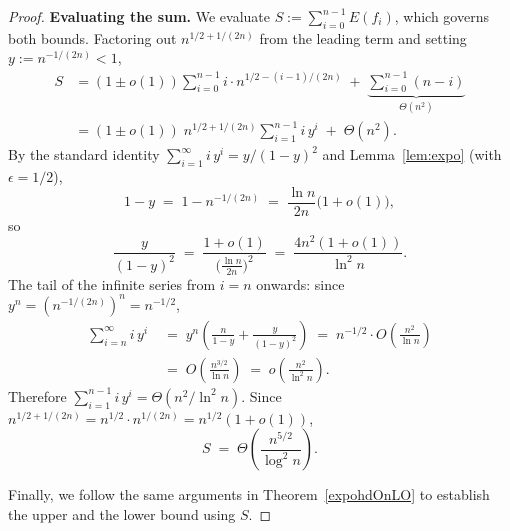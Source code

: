 \documentclass[lettersize,journal]{IEEEtran}
\begin{document}
\begin{proof}
\medskip
\noindent\textbf{Evaluating the sum.}
We evaluate $S := \sum_{i=0}^{n-1} E(f_i)$, which governs both bounds.
Factoring out $n^{1/2+1/(2n)}$ from the leading term and setting
$y:=n^{-1/(2n)}<1$,
\begin{align*}
S
&= (1\pm o(1))\sum_{i=0}^{n-1} i\cdot n^{1/2-(i-1)/(2n)}
   \;+\;\underbrace{\sum_{i=0}^{n-1}(n-i)}_{\Theta(n^2)} \\
&= (1\pm o(1))\;n^{1/2+1/(2n)}\sum_{i=1}^{n-1} i\,y^{i}
   \;+\;\Theta(n^2).
\end{align*}
By the standard identity $\sum_{i=1}^{\infty} i\,y^i = y/(1-y)^2$
and Lemma~\ref{lem:expo} (with $\epsilon=1/2$),
\[
1-y \;=\; 1 - n^{-1/(2n)}
    \;=\; \frac{\ln n}{2n}\bigl(1+o(1)\bigr),
\]
so
\[
\frac{y}{(1-y)^2}
\;=\; \frac{1+o(1)}{\bigl(\frac{\ln n}{2n}\bigr)^2}
\;=\; \frac{4n^2(1+o(1))}{\ln^2 n}.
\]
The tail of the infinite series from $i=n$ onwards:
since $y^n = (n^{-1/(2n)})^n = n^{-1/2}$,
\begin{align*}
\sum_{i=n}^{\infty} i\,y^i
\;&=\; y^n\!\left(\frac{n}{1-y}+\frac{y}{(1-y)^2}\right)
\;=\; n^{-1/2}\cdot O\!\left(\frac{n^2}{\ln n}\right)
\\\;&=\; O\!\left(\frac{n^{3/2}}{\ln n}\right)
\;=\; o\!\left(\frac{n^2}{\ln^2 n}\right).
\end{align*}
Therefore $\sum_{i=1}^{n-1} i\,y^{i} = \Theta(n^2/\ln^2 n)$.
Since $n^{1/2+1/(2n)} = n^{1/2}\cdot n^{1/(2n)} = n^{1/2}(1+o(1))$,
\begin{equation}\label{eq:S-expoHD}
S \;=\; \Theta\!\left(\frac{n^{5/2}}{\log^2 n}\right).
\end{equation}

Finally, we follow the same arguments in Theorem~\ref{expohdOnLO} to establish the upper and the lower bound using $S$.
\end{proof}
\end{document}

